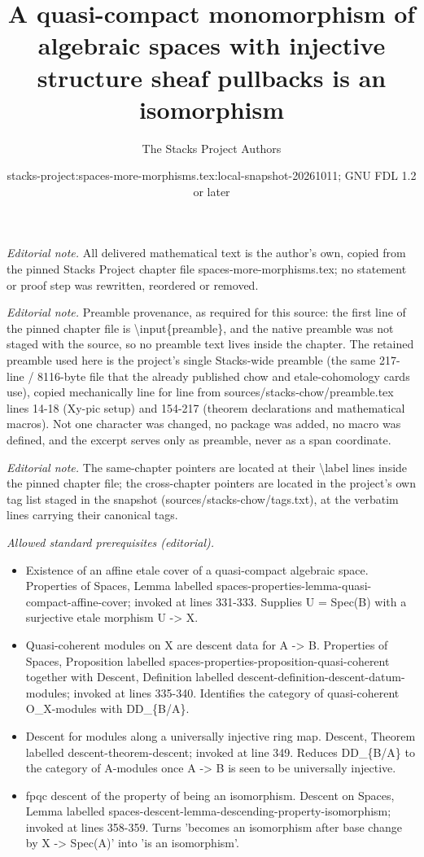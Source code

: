 \documentclass[10pt,a4paper]{amsart}
\title{A quasi-compact monomorphism of algebraic spaces with injective structure sheaf pullbacks is an isomorphism}
\author{The Stacks Project Authors}
\date{stacks-project:spaces-more-morphisms.tex:local-snapshot-20261011; GNU FDL 1.2 or later}
\theoremstyle{plain}
\theoremstyle{definition}
\theoremstyle{remark}
\numberwithin{equation}{subsection}
\begin{document}
\maketitle
\noindent\textit{Editorial note.} All delivered mathematical text is the author's own, copied from the pinned Stacks Project chapter file spaces-more-morphisms.tex; no statement or proof step was rewritten, reordered or removed.\par\medskip
\noindent\textit{Editorial note.} Preamble provenance, as required for this source: the first line of the pinned chapter file is \textbackslash{}input\{preamble\}, and the native preamble was not staged with the source, so no preamble text lives inside the chapter. The retained preamble used here is the project's single Stacks-wide preamble (the same 217-line / 8116-byte file that the already published chow and etale-cohomology cards use), copied mechanically line for line from sources/stacks-chow/preamble.tex lines 14-18 (Xy-pic setup) and 154-217 (theorem declarations and mathematical macros). Not one character was changed, no package was added, no macro was defined, and the excerpt serves only as preamble, never as a span coordinate.\par\medskip
\noindent\textit{Editorial note.} The same-chapter pointers are located at their \textbackslash{}label lines inside the pinned chapter file; the cross-chapter pointers are located in the project's own tag list staged in the snapshot (sources/stacks-chow/tags.txt), at the verbatim lines carrying their canonical tags.\par\medskip
\noindent\textit{Allowed standard prerequisites (editorial).}\begin{itemize}
\item Existence of an affine etale cover of a quasi-compact algebraic space. Properties of Spaces, Lemma labelled spaces-properties-lemma-quasi-compact-affine-cover; invoked at lines 331-333. Supplies U = Spec(B) with a surjective etale morphism U -> X.
\item Quasi-coherent modules on X are descent data for A -> B. Properties of Spaces, Proposition labelled spaces-properties-proposition-quasi-coherent together with Descent, Definition labelled descent-definition-descent-datum-modules; invoked at lines 335-340. Identifies the category of quasi-coherent O\_X-modules with DD\_\{B/A\}.
\item Descent for modules along a universally injective ring map. Descent, Theorem labelled descent-theorem-descent; invoked at line 349. Reduces DD\_\{B/A\} to the category of A-modules once A -> B is seen to be universally injective.
\item fpqc descent of the property of being an isomorphism. Descent on Spaces, Lemma labelled spaces-descent-lemma-descending-property-isomorphism; invoked at lines 358-359. Turns 'becomes an isomorphism after base change by X -> Spec(A)' into 'is an isomorphism'.
\end{itemize}\medskip
\end{document}
